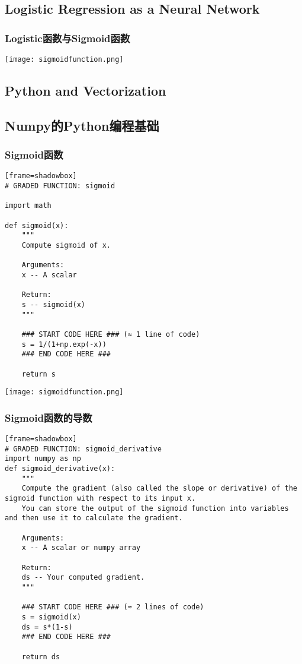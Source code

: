\documentclass[UTF_8]{ctexart}
\begin{document}
\clearpage
\subsection{Logistic Regression as a Neural Network}

\subsubsection{Logistic函数与Sigmoid函数}
\centering
\texttt{[image: sigmoidfunction.png]}
\clearpage
\subsection{Python and Vectorization}

\clearpage
\subsection{Numpy的Python编程基础}

\subsubsection{Sigmoid函数}
\begin{lstlisting}[title={$Sigmiod:s(x)=\frac{1}{(1+e^{-x})}$}][frame=shadowbox]
# GRADED FUNCTION: sigmoid

import math

def sigmoid(x):
    """
    Compute sigmoid of x.

    Arguments:
    x -- A scalar

    Return:
    s -- sigmoid(x)
    """
    
    ### START CODE HERE ### (≈ 1 line of code)
    s = 1/(1+np.exp(-x))
    ### END CODE HERE ###
    
    return s
\end{lstlisting}
\centering
\texttt{[image: sigmoidfunction.png]}


\clearpage
\subsubsection{Sigmoid函数的导数}
\begin{lstlisting}[title=${ds=s*(1-s)}$][frame=shadowbox]
# GRADED FUNCTION: sigmoid_derivative
import numpy as np
def sigmoid_derivative(x):
    """
    Compute the gradient (also called the slope or derivative) of the sigmoid function with respect to its input x.
    You can store the output of the sigmoid function into variables and then use it to calculate the gradient.
    
    Arguments:
    x -- A scalar or numpy array

    Return:
    ds -- Your computed gradient.
    """
    
    ### START CODE HERE ### (≈ 2 lines of code)
    s = sigmoid(x)
    ds = s*(1-s)
    ### END CODE HERE ###
    
    return ds
\end{lstlisting}
\end{document}
